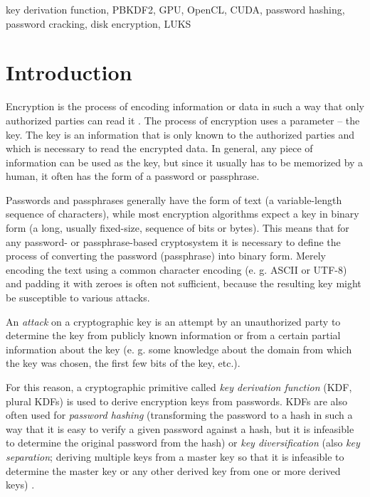 \documentclass[12pt,oneside]{fithesis2}
\begin{document}
    \begin{ThesisKeyWords}          %
      key derivation function, PBKDF2, GPU, OpenCL, CUDA, password hashing, password cracking, disk encryption, LUKS
    \end{ThesisKeyWords}
    
    \tableofcontents                %
  
  \MainMatter                     %
    \chapter{Introduction}          %
      Encryption is the process of encoding information or data in such a way that only authorized parties can read it \cite{appliedCrypto, foundations}. The process of encryption uses a parameter -- the key. The key is an information that is only known to the authorized parties and which is necessary to read the encrypted data. In general, any piece of information can be used as the key, but since it usually has to be memorized by a human, it often has the form of a password or passphrase.
    
      Passwords and passphrases generally have the form of text (a variable-length sequence of characters), while most encryption algorithms expect a key in binary form (a long, usually fixed-size, sequence of bits or bytes). This means that for any password- or pass\-phrase-based cryptosystem it is necessary to define the process of converting the password (passphrase) into binary form. Merely encoding the text using a common character encoding (e. g. ASCII or UTF-8) and padding it with zeroes is often not sufficient, because the resulting key might be susceptible to various attacks.
      
      An \emph{attack} on a cryptographic key is an attempt by an unauthorized party to determine the key from publicly known information or from a certain partial information about the key (e. g. some knowledge about the domain from which the key was chosen, the first few bits of the key, etc.).
    
      For this reason, a cryptographic primitive called \emph{key derivation function} (KDF, plural KDFs) is used to derive encryption keys from passwords. KDFs are also often used for \emph{password hashing} (transforming the password to a hash in such a way that it is easy to verify a given password against a hash, but it is infeasible to determine the original password from the hash) or \emph{key diversification} (also \emph{key separation}; deriving multiple keys from a master key so that it is infeasible to determine the master key or any other derived key from one or more derived keys) \cite{wiki:KDF, nist:sp800:108}.
    
\end{document}
